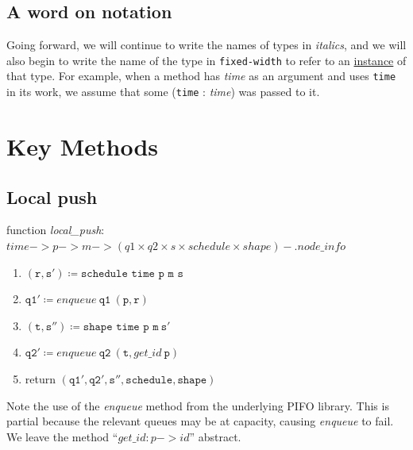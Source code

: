 \documentclass{article}
\newcommand{\hide}[1]{}
\begin{document}
\subsection{A word on notation}

Going forward, we will continue to write the names of types in \textit{italics},
and we will also begin to write the name of the type in  \texttt{fixed-width} 
to refer to an \underline{instance} of that type. 
For example, when a method has \textit{time} as an argument
and uses \texttt{time} in its work, we assume that 
some (\texttt{time} : \textit{time}) was passed to it.


\section{Key Methods}

\subsection{Local push}

function \textit{local\_push}: 
$\mathit{time} -> p -> m -> (q1 \times q2 \times s \times \mathit{schedule} \times \mathit{shape}) -. \mathit{node\_info}$ 
\begin{enumerate}
\item $(\mathtt{r}, \mathtt{s'}) \coloneqq \texttt{schedule time p m s}$
\item $\mathtt{q1'} \coloneqq \mathit{enqueue}~\mathtt{q1}~(\mathtt{p}, \mathtt{r})$
\item $(\mathtt{t}, \mathtt{s''}) \coloneqq \texttt{shape time p m}~\mathtt{s'}$ 
\item $\mathtt{q2'} \coloneqq \mathit{enqueue}~\mathtt{q2}~(\mathtt{t}, \mathit{get\_id}~\mathtt{p}) $
\item return $(\mathtt{q1'}, \mathtt{q2'}, \mathtt{s''}, \mathtt{schedule}, \mathtt{shape})$
\end{enumerate}

\hide{The boolean argument is \texttt{isroot}, which says whether the node 
we are working on is the root node of the tree. We use this exactly 
as seen in step 3 above, because we want to keep the root's shaping queue empty.
We will discuss this further in \S3.2.}
\noindent Note the use of the \textit{enqueue} method from the underlying PIFO library.
This is partial because the relevant queues may be at capacity, causing \textit{enqueue} to fail.
We leave the method ``$\mathit{get\_id: p -> \mathit{id}}$'' abstract.
\end{document}
